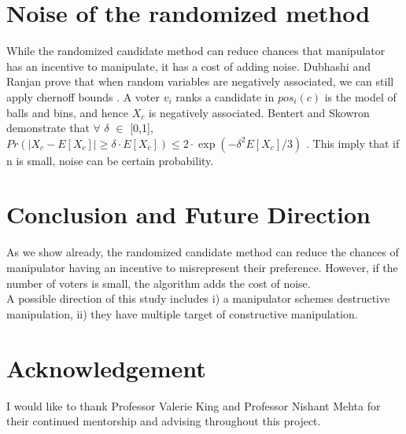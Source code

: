 \documentclass[letterpaper]{article} %
\begin{document}
\section{Noise of the randomized method}
While the randomized candidate method can reduce chances that manipulator has an incentive to manipulate, it has a cost of adding noise. Dubhashi and Ranjan prove that when random variables are negatively associated, we can still apply chernoff bounds \cite{BRICS}. A voter $v_i$ ranks a candidate in $pos_i(c)$ is the model of balls and bins, and hence $X_c$ is negatively associated. Bentert and Skowron demonstrate that $\forall$ $\delta$ $\in$ [0,1], $Pr(|X_c-E[X_c]| \geq \delta\cdot E[X_c]) \leq 2\cdot\exp\left(-\delta^2E[X_c]/3 \right) $ \cite{Skowron}. This imply that if n is small, noise can be certain probability. \\
\section{Conclusion and Future Direction}
As we show already, the randomized candidate method can reduce the chances of manipulator having an incentive to misrepresent their preference. %
However, if the number of voters is small, the algorithm adds the cost of noise.\\
A possible direction of this study includes i) a manipulator schemes destructive manipulation, ii) they have multiple target of constructive manipulation. %


\section{Acknowledgement}
I would like to thank Professor Valerie King and Professor Nishant Mehta for their continued mentorship and advising throughout this project.




\end{document}
